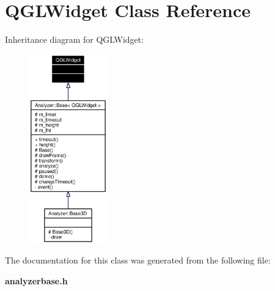 \section{QGLWidget Class Reference}
\label{classQGLWidget}
Inheritance diagram for QGLWidget:\begin{figure}[H]
\begin{center}
\leavevmode
\includegraphics[width=95pt]{classQGLWidget__inherit__graph}
\end{center}
\end{figure}


The documentation for this class was generated from the following file:\begin{CompactItemize}
\item 
{\bf analyzerbase.h}\end{CompactItemize}
